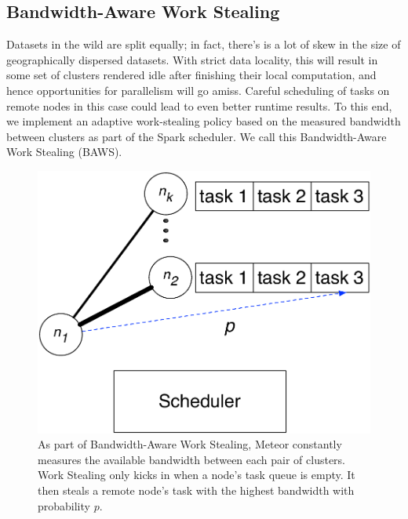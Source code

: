 \subsection{Bandwidth-Aware Work Stealing}

Datasets in the wild are split equally; in fact, there's is a lot of skew in the size of geographically dispersed datasets.  With strict data locality, this will result in some set of clusters rendered idle after finishing their local computation, and hence opportunities for parallelism will go amiss.  Careful scheduling of tasks on remote nodes in this case could lead to even better runtime results. To this end, we implement an adaptive work-stealing policy based on the measured bandwidth between clusters as part of the Spark scheduler. We call this Bandwidth-Aware Work Stealing (BAWS). 

\begin{figure}[!ht]
\centering\includegraphics[width=0.5\columnwidth]{figs/BOSS.pdf}
\vspace{-1.2em}
\caption{As part of Bandwidth-Aware Work Stealing, Meteor constantly measures the available bandwidth between each pair of clusters. Work Stealing only kicks in when a node's task queue is empty. It then steals a remote node's task with the highest bandwidth with probability $p$. }
\label{fig:lam}
\vspace{.7em}
\end{figure}
